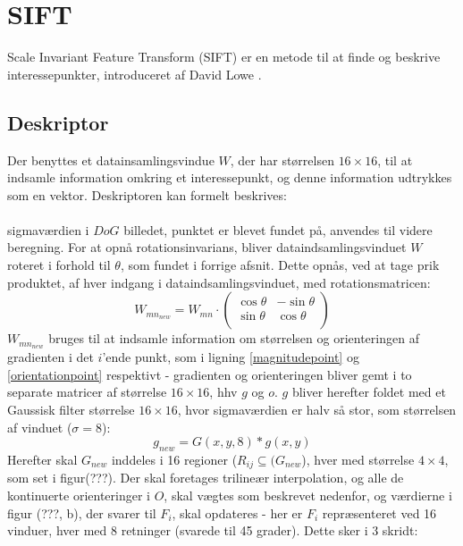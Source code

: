 \section{SIFT}
Scale Invariant Feature Transform (SIFT) er en metode til at finde og beskrive interessepunkter, introduceret af David Lowe \cite{SIFT}.


\subsection{Deskriptor}
Der benyttes et datainsamlingsvindue $W$, der har størrelsen $16 \times 16$, til at indsamle information omkring et interessepunkt, og denne information udtrykkes som en vektor. Deskriptoren kan formelt beskrives:
\\
\\
sigmaværdien i $DoG$ billedet, punktet er blevet fundet på, anvendes til videre beregning. For at opnå rotationsinvarians, bliver dataindsamlingsvinduet $W$ roteret i forhold til $\theta$, som fundet i forrige afsnit. Dette opnås, ved at tage prik produktet, af hver indgang i dataindsamlingsvinduet, med rotationsmatricen:
\begin{equation}
W_{{mn}_{new}} = W_{mn} \cdot
\begin{pmatrix}
  \cos \theta & -\sin \theta \\
  \sin \theta & \cos \theta  \\
\end{pmatrix}
\label{rotaionmatrix}
\end{equation}
$W_{{mn}_{new}}$ bruges til at indsamle information om størrelsen og orienteringen af gradienten i det $i$'ende punkt, som i ligning \eqref{magnitudepoint} og \eqref{orientationpoint} respektivt - gradienten og orienteringen bliver gemt i to separate matricer af størrelse $16\times16$, hhv $g$ og $o$. $g$ bliver herefter foldet med et Gaussisk filter størrelse $16\times16$, hvor sigmaværdien er halv så stor, som størrelsen af vinduet ($\sigma=8$):
\begin{equation}
g_{new} = G(x,y,8) * g(x,y)
\label{gradientsmooth}
\end{equation}
Herefter skal $G_{new}$ inddeles i 16 regioner ($R_{ij} \subseteq (G_{new}$), hver med størrelse $4\times4$, som set i figur(???). Der skal foretages trilineær interpolation, og alle de kontinuerte orienteringer i $O$, skal vægtes som beskrevet nedenfor, og værdierne i figur (???, b), der svarer til $F_i$, skal opdateres - her er $F_i$ repræsenteret ved 16 vinduer, hver med 8 retninger (svarede til 45 grader). Dette sker i 3 skridt:
